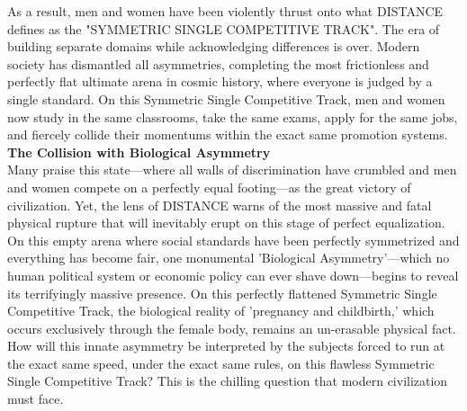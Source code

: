 As a result, men and women have been violently thrust onto what DISTANCE defines as the "SYMMETRIC SINGLE COMPETITIVE TRACK". The era of building separate domains while acknowledging differences is over. Modern society has dismantled all asymmetries, completing the most frictionless and perfectly flat ultimate arena in cosmic history, where everyone is judged by a single standard. On this Symmetric Single Competitive Track, men and women now study in the same classrooms, take the same exams, apply for the same jobs, and fiercely collide their momentums within the exact same promotion systems. \\
\textbf{The Collision with Biological Asymmetry} \\
Many praise this state—where all walls of discrimination have crumbled and men and women compete on a perfectly equal footing—as the great victory of civilization. Yet, the lens of DISTANCE warns of the most massive and fatal physical rupture that will inevitably erupt on this stage of perfect equalization.
On this empty arena where social standards have been perfectly symmetrized and everything has become fair, one monumental 'Biological Asymmetry'—which no human political system or economic policy can ever shave down—begins to reveal its terrifyingly massive presence. On this perfectly flattened Symmetric Single Competitive Track, the biological reality of 'pregnancy and childbirth,' which occurs exclusively through the female body, remains an un-erasable physical fact.
How will this innate asymmetry be interpreted by the subjects forced to run at the exact same speed, under the exact same rules, on this flawless Symmetric Single Competitive Track? This is the chilling question that modern civilization must face.